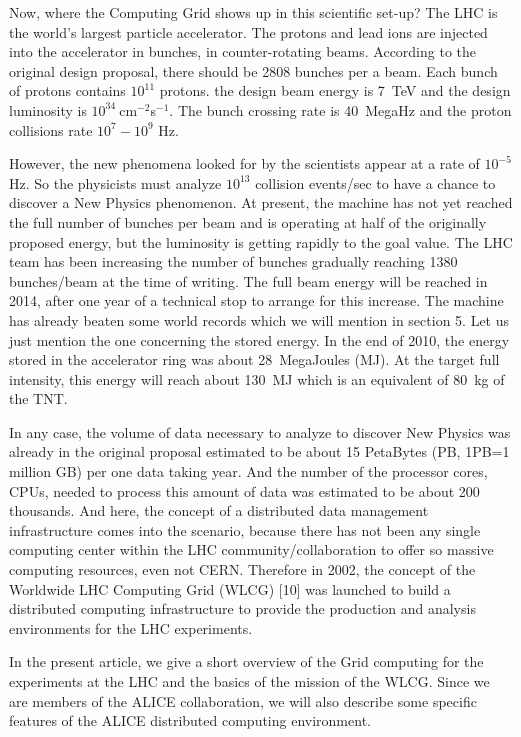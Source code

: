 \documentclass{intech}
\begin{document}
Now, where the Computing Grid shows up in this scientific set-up?
The LHC is the world's largest particle accelerator. The protons and
lead ions are injected into the accelerator in bunches, in
counter-rotating beams. According to the original design proposal,
there should be 2808 bunches per a beam. Each bunch of protons
contains $10^{11}$ protons. the design beam energy is 7~TeV and the
design luminosity is $10^{34}\ $cm${}^{-2}$s${}^{-1}$. The bunch
crossing rate is 40~MegaHz and the proton collisions rate
$10^7-10^9$ Hz.

However, the new phenomena looked for by the scientists appear at a
rate of $10^{-5}$ Hz. So the physicists must analyze $10^{13}$
collision events/sec to have a chance to discover a New Physics
phenomenon. At present, the machine has not yet reached the full
number of bunches per beam and is operating at half of the
originally proposed energy, but the luminosity is getting rapidly to
the goal value. The LHC team has been increasing the number of
bunches gradually reaching 1380 bunches/beam at the time of writing.
The full beam energy will be reached in 2014, after one year of a
technical stop to arrange for this increase. The machine has already
beaten some world records which we will mention in section 5. Let us
just mention the one concerning the stored energy. In the end of
2010, the energy stored in the accelerator ring was about 28~MegaJoules (MJ).
At the target full intensity, this energy will
reach about 130~MJ which is an equivalent of 80~kg of the TNT.

In any case, the volume of data necessary to analyze to discover New
Physics was already in the original proposal estimated to be about
15 PetaBytes (PB, 1PB=1 million GB) per one data taking year. And
the number of the processor cores, CPUs, needed to process this
amount of data was estimated to be about 200 thousands. And here,
the concept of a distributed data management infrastructure comes
into the scenario, because there has not been any single computing
center within the LHC community/collaboration to offer so massive
computing resources, even not CERN. Therefore in 2002, the concept
of the Worldwide LHC Computing Grid (WLCG) [10] was launched to
build a distributed computing infrastructure to provide the
production and analysis environments for the LHC experiments.

In the present article, we give a short overview of the Grid
computing for the experiments at the LHC and the basics of the
mission of the WLCG.  Since we are members of the ALICE
collaboration, we will also describe some specific features of the
ALICE distributed computing environment.
\end{document}
